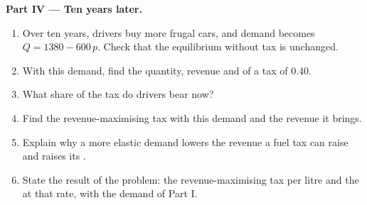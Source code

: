 \begin{problem}
\medskip
\noindent\textbf{Part IV --- Ten years later.}
\begin{enumerate}[resume]
\item Over ten years, drivers buy more frugal cars, and demand becomes $Q = 1380 - 600\,p$. Check that the equilibrium without tax is unchanged.
\item With this demand, find the quantity, revenue and  of a tax of 0.40.
\item What share of the tax do drivers bear now?
\item Find the revenue-maximising tax with this demand and the revenue it brings.
\item Explain why a more elastic demand lowers the revenue a fuel tax can raise and raises its .
\item State the result of the problem: the revenue-maximising tax per litre and the  at that rate, with the demand of Part I.
\end{enumerate}
\end{problem}
